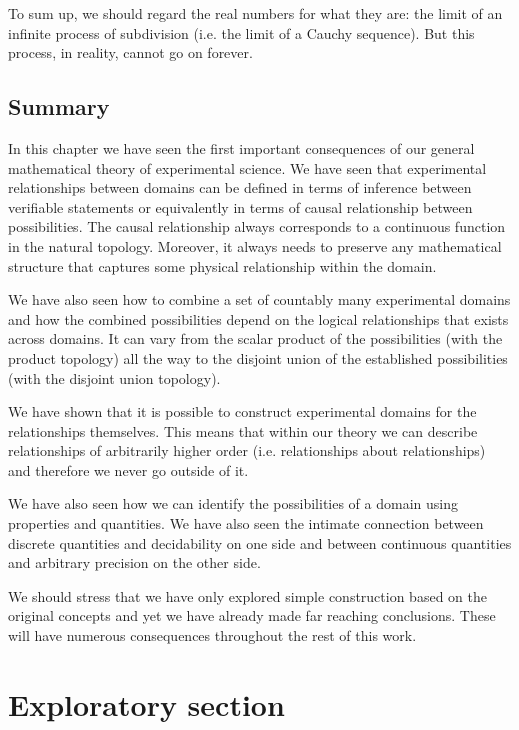 \documentclass[11pt,letterpaper,fleqn]{memoir} %
\begin{document}
To sum up, we should regard the real numbers for what they are: the limit of an infinite process of subdivision (i.e. the limit of a Cauchy sequence). But this process, in reality, cannot go on forever.

\section{Summary}

In this chapter we have seen the first important consequences of our general mathematical theory of experimental science. We have seen that experimental relationships between domains can be defined in terms of inference between verifiable statements or equivalently in terms of causal relationship between possibilities. The causal relationship always corresponds to a continuous function in the natural topology. Moreover, it always needs to preserve any mathematical structure that captures some physical relationship within the domain.

We have also seen how to combine a set of countably many experimental domains and how the combined possibilities depend on the logical relationships that exists across domains. It can vary from the scalar product of the possibilities (with the product topology) all the way to the disjoint union of the established possibilities (with the disjoint union topology).

We have shown that it is possible to construct experimental domains for the relationships themselves. This means that within our theory we can describe relationships of arbitrarily higher order (i.e. relationships about relationships) and therefore we never go outside of it.

We have also seen how we can identify the possibilities of a domain using properties and quantities. We have also seen the intimate connection between discrete quantities and decidability on one side and between continuous quantities and arbitrary precision on the other side.

We should stress that we have only explored simple construction based on the original concepts and yet we have already made far reaching conclusions. These will have numerous consequences throughout the rest of this work. 

\appendix

\chapter{Exploratory section}
\end{document}

